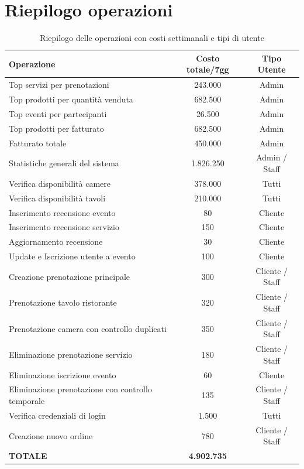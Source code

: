 \documentclass[a4paper,12pt]{report}
\begin{document}
\section{Riepilogo operazioni}
\begin{table}[H]
    \centering
    \small
    \renewcommand{\arraystretch}{1.2}
    \begin{tabularx}{\textwidth}{|>{\raggedright\arraybackslash}X|c|c|}
        \hline
        \rowcolor{gray!20}
        \textbf{Operazione} & \textbf{Costo totale/7gg} & \textbf{Tipo Utente} \\
        \hline
        Top servizi per prenotazioni & 243.000 & Admin \\
        \hline
        Top prodotti per quantità venduta & 682.500 & Admin \\
        \hline
        Top eventi per partecipanti & 26.500 & Admin \\
        \hline
        Top prodotti per fatturato & 682.500 & Admin \\
        \hline
        Fatturato totale & 450.000 & Admin \\
        \hline
        Statistiche generali del sistema & 1.826.250 & Admin / Staff \\
        \hline
        Verifica disponibilità camere & 378.000 & Tutti \\
        \hline
        Verifica disponibilità tavoli & 210.000 & Tutti \\
        \hline
        Inserimento recensione evento & 80 & Cliente \\
        \hline
        Inserimento recensione servizio & 150 & Cliente \\
        \hline
        Aggiornamento recensione & 30 & Cliente \\
        \hline
        Update e Iscrizione utente a evento & 100 & Cliente \\
        \hline
        Creazione prenotazione principale & 300 & Cliente / Staff \\
        \hline
        Prenotazione tavolo ristorante & 320 & Cliente / Staff \\
        \hline
        Prenotazione camera con controllo duplicati & 350 & Cliente / Staff \\
        \hline
        Eliminazione prenotazione servizio & 180 & Cliente / Staff \\
        \hline
        Eliminazione iscrizione evento & 60 & Cliente \\
        \hline
        Eliminazione prenotazione con controllo temporale & 135 & Cliente / Staff \\
        \hline
        Verifica credenziali di login & 1.500 & Tutti \\
        \hline
        Creazione nuovo ordine & 780 & Cliente / Staff \\
        \hline
        \rowcolor{gray!20}
        \textbf{TOTALE} & \textbf{4.902.735} & \\
        \hline
    \end{tabularx}
    \caption{Riepilogo delle operazioni con costi settimanali e tipi di utente}
    \label{tab:riepilogo-operazioni}
\end{table}
\end{document}
